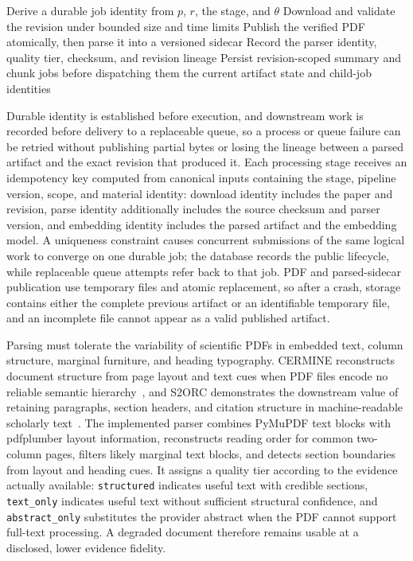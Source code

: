 \begin{algorithm}[htbp]
  \caption{Revision-safe document preparation}
  \label{alg:document-preparation}
  Derive a durable job identity from \(p\), \(r\), the stage, and \(\theta\)\;
  Download and validate the revision under bounded size and time limits\;
  Publish the verified PDF atomically, then parse it into a versioned sidecar\;
  Record the parser identity, quality tier, checksum, and revision lineage\;
  Persist revision-scoped summary and chunk jobs before dispatching them\;
  \Return the current artifact state and child-job identities\;
\end{algorithm}

Durable identity is established before execution, and downstream work is recorded before delivery to a replaceable queue, so a process or queue failure can be retried without publishing partial bytes or losing the lineage between a parsed artifact and the exact revision that produced it.
Each processing stage receives an idempotency key computed from canonical inputs containing the stage, pipeline version, scope, and material identity: download identity includes the paper and revision, parse identity additionally includes the source checksum and parser version, and embedding identity includes the parsed artifact and the embedding model.
A uniqueness constraint causes concurrent submissions of the same logical work to converge on one durable job; the database records the public lifecycle, while replaceable queue attempts refer back to that job.
PDF and parsed-sidecar publication use temporary files and atomic replacement, so after a crash, storage contains either the complete previous artifact or an identifiable temporary file, and an incomplete file cannot appear as a valid published artifact.

Parsing must tolerate the variability of scientific PDFs in embedded text, column structure, marginal furniture, and heading typography.
CERMINE reconstructs document structure from page layout and text cues when PDF files encode no reliable semantic hierarchy~\cite{tkaczyk2015cermine}, and S2ORC demonstrates the downstream value of retaining paragraphs, section headers, and citation structure in machine-readable scholarly text~\cite{lo2020s2orc}.
The implemented parser combines PyMuPDF text blocks with pdfplumber layout information, reconstructs reading order for common two-column pages, filters likely marginal text blocks, and detects section boundaries from layout and heading cues.
It assigns a quality tier according to the evidence actually available: \texttt{structured} indicates useful text with credible sections, \texttt{text\_only} indicates useful text without sufficient structural confidence, and \texttt{abstract\_only} substitutes the provider abstract when the PDF cannot support full-text processing. A degraded document therefore remains usable at a disclosed, lower evidence fidelity.

